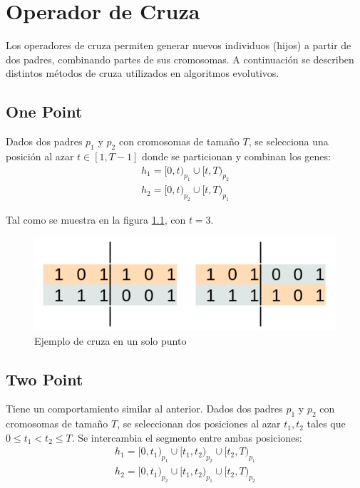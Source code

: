 \chapter{Operador de Cruza}

Los operadores de cruza permiten generar nuevos individuos (hijos) a partir de dos padres, combinando partes de sus cromosomas. A continuación se describen distintos métodos de cruza utilizados en algoritmos evolutivos.

\section{One Point}

Dados dos padres $p_1$ y $p_2$ con cromosomas de tamaño $T$, se selecciona una posición al azar $t \in [1, T-1]$ donde se particionan y combinan los genes:
\begin{gather*}
	h_1 = [0, t)_{p_1} \cup [t, T)_{p_2} \\
	h_2 = [0, t)_{p_2} \cup [t, T)_{p_1}
\end{gather*}

Tal como se muestra en la figura \ref{fig:cross_one}, con $t = 3$.

\begin{figure}[H]
	\centering
	\includegraphics[width=0.75\linewidth]{img/cross_one.png}
	\caption{Ejemplo de cruza en un solo punto}
	\label{fig:cross_one}
\end{figure}

\section{Two Point}

Tiene un comportamiento similar al anterior. Dados dos padres $p_1$ y $p_2$ con cromosomas de tamaño $T$, se seleccionan dos posiciones al azar $t_1, t_2$ tales que $0 \leq t_1 < t_2 \leq T$. Se intercambia el segmento entre ambas posiciones:
\begin{gather*}
	h_1 = [0, t_1)_{p_1} \cup [t_1, t_2)_{p_2} \cup [t_2, T)_{p_1} \\
	h_2 = [0, t_1)_{p_2} \cup [t_1, t_2)_{p_1} \cup [t_2, T)_{p_2}
\end{gather*}

